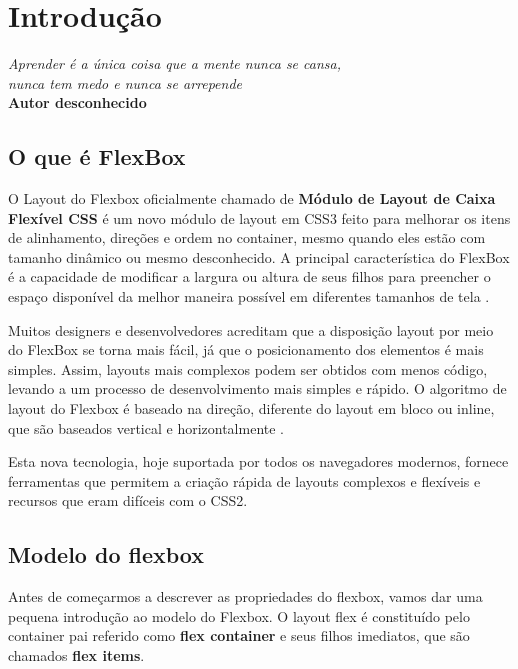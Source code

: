 \chapter{Introdução}

\begin{flushright}
  \textit{
    Aprender é a única coisa que a mente nunca se cansa, \\
    nunca tem medo e nunca se arrepende
  } \\
  
  \textbf{Autor desconhecido}
\end{flushright}

\section{O que é FlexBox}

O Layout do Flexbox oficialmente chamado de \textbf{Módulo de Layout de Caixa Flexível CSS} é um novo módulo de layout em CSS3 feito para melhorar os itens de alinhamento, direções e ordem no container, mesmo quando eles estão com tamanho dinâmico ou mesmo desconhecido. A principal característica do FlexBox é a capacidade de modificar a largura ou altura de seus filhos para preencher o espaço disponível da melhor maneira possível em diferentes tamanhos de tela \cite{Stojanov2015}.

Muitos designers e desenvolvedores acreditam que a disposição layout por meio do FlexBox se torna mais fácil, já que o posicionamento dos elementos é mais simples. Assim, layouts mais complexos podem ser obtidos com menos código, levando a um processo de desenvolvimento mais simples e rápido. O algoritmo de layout do Flexbox é baseado na direção, diferente do layout em bloco ou inline, que são baseados vertical e horizontalmente \cite{Stojanov2015}.

Esta nova tecnologia, hoje suportada por todos os navegadores modernos, fornece ferramentas que permitem a criação rápida de layouts complexos e flexíveis e recursos que eram difíceis com o CSS2. 

\section{Modelo do flexbox}

Antes de começarmos a descrever as propriedades do flexbox, vamos dar uma pequena introdução ao modelo do Flexbox. O layout flex é constituído pelo container pai referido como \textbf{flex container} e seus filhos imediatos, que são chamados \textbf{flex items}.

